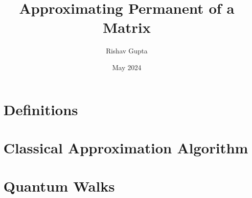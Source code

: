 \documentclass{article}
\title{Approximating Permanent of a Matrix }
\author{Rishav Gupta}
\date{May 2024}
\begin{document}
	
	\maketitle
	\tableofcontents
	\break
\section{Definitions}
	
	\break
\section{Classical Approximation Algorithm}
	
\section{Quantum Walks}
	
\end{document}
